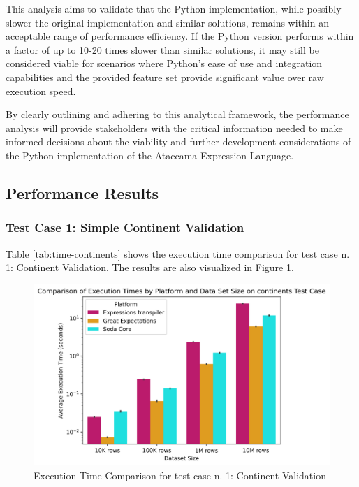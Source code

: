 This analysis aims to validate that the Python implementation, while possibly slower the original implementation and similar solutions, remains within an acceptable range of performance efficiency. If the Python version performs within a factor of up to 10-20 times slower than similar solutions, it may still be considered viable for scenarios where Python’s ease of use and integration capabilities and the provided feature set provide significant value over raw execution speed. 

By clearly outlining and adhering to this analytical framework, the performance analysis will provide stakeholders with the critical information needed to make informed decisions about the viability and further development considerations of the Python implementation of the Ataccama Expression Language.

\subsection{Performance Results}

\subsubsection{Test Case 1: Simple Continent Validation}

Table \ref{tab:time-continents} shows the execution time comparison for test case n. 1: Continent Validation. The results are also visualized in Figure \ref{fig:time-comparison-continents}.

\begin{table}[h] 
    \centering 
    \caption{Execution Time Comparison for test case n. 1: Continent Validation} 
    \label{tab:time-continents} 
    
\end{table}

\begin{figure}[htbp]
  \centering
  \includegraphics[width=1.0\columnwidth]{result-analysis/plots/execution_time_comparison_continents.png}
  \caption{Execution Time Comparison for test case n. 1: Continent Validation}
  \label{fig:time-comparison-continents}
\end{figure}


